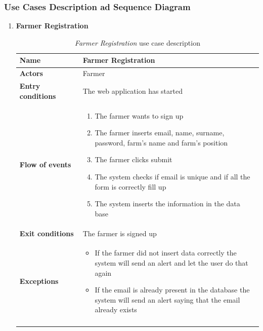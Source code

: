 \subsubsection{Use Cases Description ad Sequence Diagram}
\begin{enumerate}
    \item \textbf{Farmer Registration} 
        \begin{longtable}{p{0.26\linewidth}p{0.75\linewidth}}
            \toprule
            \textbf{Name} & \textbf{Farmer Registration} \\
            \midrule
            \textbf{Actors} & Farmer \\
            \midrule
            \textbf{Entry conditions} & The web application has started\\
            \midrule
            \textbf{Flow of events} & 
            \begin{enumerate}
                \item The farmer wants to sign up
                \item The farmer inserts email, name, surname, password, farm's name and farm's position 
                \item The farmer clicks submit
                \item The system checks if email is unique and if all the form is correctly fill up 
                \item The system inserts the information in the data base
            \end{enumerate} \\
            \midrule
            \textbf{Exit conditions} & The farmer is signed up\\
            \midrule
            \textbf{Exceptions} & 
            \begin{itemize}
                \item If the farmer did not insert data correctly the system will send an alert and let the user do that again
                \item If the email is already present in the database the system will send an alert saying that the email already exists
            \end{itemize} \\
            \bottomrule
            \caption{\emph{Farmer Registration} use case description}
        \end{longtable}
        

\end{enumerate}
